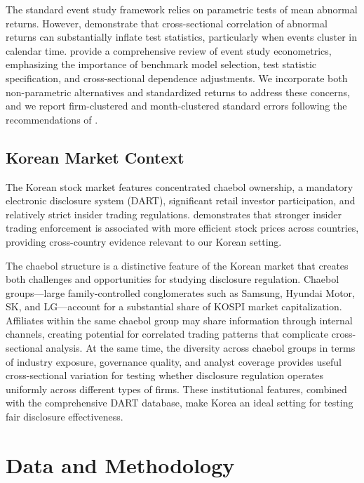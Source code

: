 \documentclass[manuscript,review]{acmart}
\begin{document}
The standard event study framework \cite{brown1985using, mackinlay1997event} relies on parametric tests of mean abnormal returns. However, \citet{kolari2010event} demonstrate that cross-sectional correlation of abnormal returns can substantially inflate test statistics, particularly when events cluster in calendar time. \citet{kothari2016econometrics} provide a comprehensive review of event study econometrics, emphasizing the importance of benchmark model selection, test statistic specification, and cross-sectional dependence adjustments. We incorporate both non-parametric alternatives and standardized returns to address these concerns, and we report firm-clustered and month-clustered standard errors following the recommendations of \citet{kolari2010event}.

\subsection{Korean Market Context}

The Korean stock market features concentrated chaebol ownership, a mandatory electronic disclosure system (DART), significant retail investor participation, and relatively strict insider trading regulations. \citet{beny2005impact} demonstrates that stronger insider trading enforcement is associated with more efficient stock prices across countries, providing cross-country evidence relevant to our Korean setting.

The chaebol structure is a distinctive feature of the Korean market that creates both challenges and opportunities for studying disclosure regulation. Chaebol groups---large family-controlled conglomerates such as Samsung, Hyundai Motor, SK, and LG---account for a substantial share of KOSPI market capitalization. Affiliates within the same chaebol group may share information through internal channels, creating potential for correlated trading patterns that complicate cross-sectional analysis. At the same time, the diversity across chaebol groups in terms of industry exposure, governance quality, and analyst coverage provides useful cross-sectional variation for testing whether disclosure regulation operates uniformly across different types of firms. These institutional features, combined with the comprehensive DART database, make Korea an ideal setting for testing fair disclosure effectiveness.

\section{Data and Methodology}
\end{document}
